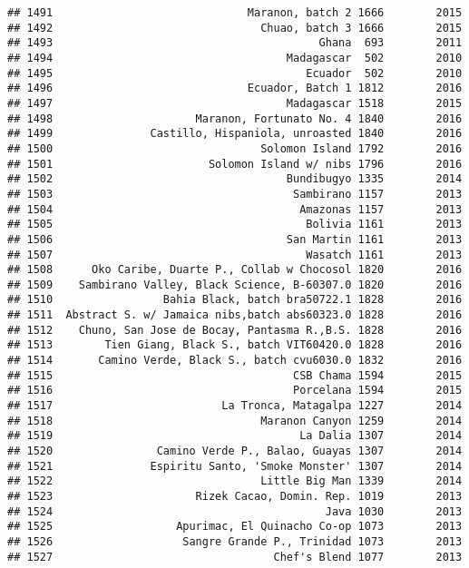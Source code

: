 \documentclass[
]{article}
\begin{document}
\begin{verbatim}
## 1491                              Maranon, batch 2 1666        2015
## 1492                                Chuao, batch 3 1666        2015
## 1493                                         Ghana  693        2011
## 1494                                    Madagascar  502        2010
## 1495                                       Ecuador  502        2010
## 1496                              Ecuador, Batch 1 1812        2016
## 1497                                    Madagascar 1518        2015
## 1498                      Maranon, Fortunato No. 4 1840        2016
## 1499               Castillo, Hispaniola, unroasted 1840        2016
## 1500                                Solomon Island 1792        2016
## 1501                        Solomon Island w/ nibs 1796        2016
## 1502                                    Bundibugyo 1335        2014
## 1503                                     Sambirano 1157        2013
## 1504                                      Amazonas 1157        2013
## 1505                                       Bolivia 1161        2013
## 1506                                    San Martin 1161        2013
## 1507                                       Wasatch 1161        2013
## 1508      Oko Caribe, Duarte P., Collab w Chocosol 1820        2016
## 1509    Sambirano Valley, Black Science, B-60307.0 1820        2016
## 1510                 Bahia Black, batch bra50722.1 1828        2016
## 1511  Abstract S. w/ Jamaica nibs,batch abs60323.0 1828        2016
## 1512    Chuno, San Jose de Bocay, Pantasma R.,B.S. 1828        2016
## 1513        Tien Giang, Black S., batch VIT60420.0 1828        2016
## 1514       Camino Verde, Black S., batch cvu6030.0 1832        2016
## 1515                                     CSB Chama 1594        2015
## 1516                                     Porcelana 1594        2015
## 1517                          La Tronca, Matagalpa 1227        2014
## 1518                                Maranon Canyon 1259        2014
## 1519                                      La Dalia 1307        2014
## 1520                Camino Verde P., Balao, Guayas 1307        2014
## 1521               Espiritu Santo, 'Smoke Monster' 1307        2014
## 1522                                Little Big Man 1339        2014
## 1523                      Rizek Cacao, Domin. Rep. 1019        2013
## 1524                                          Java 1030        2013
## 1525                   Apurimac, El Quinacho Co-op 1073        2013
## 1526                    Sangre Grande P., Trinidad 1073        2013
## 1527                                  Chef's Blend 1077        2013

\end{verbatim}
\end{document}
